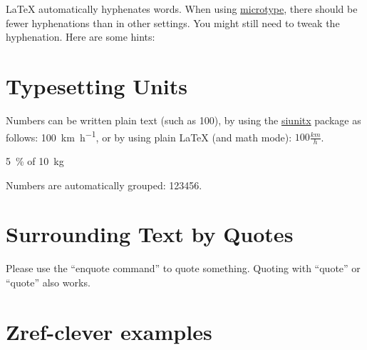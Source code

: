 \documentclass[../main-german]{subfiles}
\begin{document}
\LaTeX{} automatically hyphenates words.
When using \href{https://ctan.org/pkg/microtype}{microtype}, there should be fewer hyphenations than in other settings.
You might still need to tweak the hyphenation.
Here are some hints:


\section{Typesetting Units}

\begin{ltgexample}
Numbers can be written plain text (such as 100), by using the \href{https://ctan.org/pkg/siunitx}{siunitx} package as follows:
\SI{100}{\km\per\hour},
or by using plain \LaTeX{} (and math mode):
$100 \frac{\mathit{km}}{h}$.
\end{ltgexample}

\begin{ltgexample}
\SI{5}{\percent} of \SI{10}{kg}
\end{ltgexample}

\begin{ltgexample}
Numbers are automatically grouped: \num{123456}.
\end{ltgexample}

\section{Surrounding Text by Quotes}

\begin{ltgexample}
Please use the \enquote{enquote command} to quote something.
Quoting with "`quote"' or ``quote'' also works. %

\end{ltgexample}

\section{Zref-clever examples}
\label{sec:ex:cref}
\end{document}
